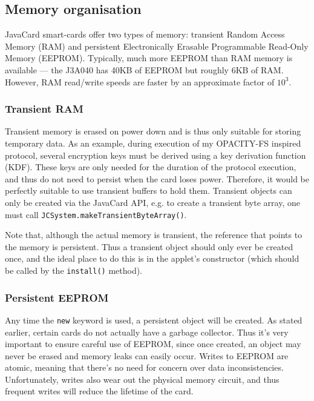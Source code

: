 \documentclass[12pt,a4paper,twoside,openright]{report}
\begin{document}
\subsection{Memory organisation} \label{javacardmemory}

JavaCard smart-cards offer two types of memory: transient Random Access Memory (RAM) and persistent Electronically Erasable Programmable Read-Only Memory (EEPROM). Typically, much more EEPROM than RAM memory is available --- the J3A040 has 40KB of EEPROM but roughly 6KB of RAM. However, RAM read/write speeds are faster by an approximate factor of $10^3$.

\subsubsection{Transient RAM}

Transient memory is erased on power down and is thus only suitable for storing temporary data. As an example, during execution of my OPACITY-FS inspired protocol, several encryption keys must be derived using a key derivation function (KDF). These keys are only needed for the duration of the protocol execution, and thus do not need to persist when the card loses power. Therefore, it would be perfectly suitable to use transient buffers to hold them. Transient objects can only be created via the JavaCard API, e.g. to create a transient byte array, one must call \texttt{JCSystem.makeTransientByteArray()}.

Note that, although the actual memory is transient, the reference that points to the memory is persistent. Thus a transient object should only ever be created once, and the ideal place to do this is in the applet's constructor (which should be called by the \texttt{install()} method).

\subsubsection{Persistent EEPROM}

Any time the \texttt{new} keyword is used, a persistent object will be created. As stated earlier, certain cards do not actually have a garbage collector. Thus it's very important to ensure careful use of EEPROM, since once created, an object may never be erased and memory leaks can easily occur. Writes to EEPROM are atomic, meaning that there's no need for concern over data inconsistencies. Unfortunately, writes also wear out the physical memory circuit, and thus frequent writes will reduce the lifetime of the card.
\end{document}
